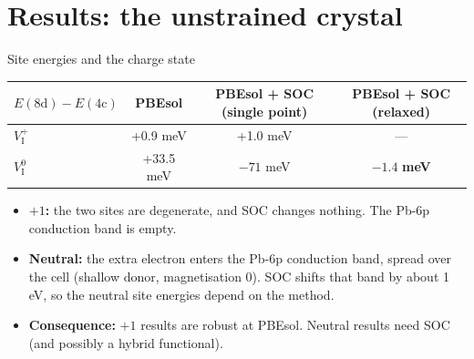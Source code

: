 \documentclass[aspectratio=169,10pt]{beamer}
\begin{document}
\section{Results: the unstrained crystal}

\begin{frame}{Site energies and the charge state}
  \centering\small
  \begin{tabular}{lccc}
    \toprule
    $E(\mathrm{8d}) - E(\mathrm{4c})$ & PBEsol & PBEsol + SOC (single point) & PBEsol + SOC (relaxed) \\
    \midrule
    $V_\mathrm{I}^{+}$ & +0.9 meV & +1.0 meV & --- \\
    $V_\mathrm{I}^{0}$ & +33.5 meV & $-71$ meV & $\mathbf{-1.4}$ \textbf{meV} \\
    \bottomrule
  \end{tabular}

  \vspace{0.6em}
  \raggedright
  \begin{itemize}
    \item \textbf{$+1$:} the two sites are degenerate, and SOC changes nothing. The Pb-6p conduction band is empty.
    \item \textbf{Neutral:} the extra electron enters the Pb-6p conduction band, spread over the cell (shallow donor, magnetisation 0). SOC shifts that band by about 1 eV, so the neutral site energies depend on the method.
    \item \textbf{Consequence:} $+1$ results are robust at PBEsol. Neutral results need SOC (and possibly a hybrid functional).
  \end{itemize}
\end{frame}
\end{document}
